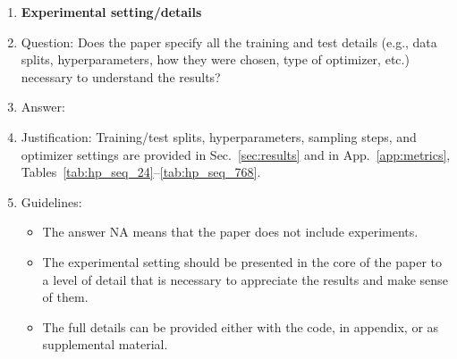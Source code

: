 \documentclass{article}
\theoremstyle{plain}
\theoremstyle{definition}
\theoremstyle{remark}
\begin{document}
{\begin{enumerate}
\item {\bf Experimental setting/details}
    \item[] Question: Does the paper specify all the training and test details (e.g., data splits, hyperparameters, how they were chosen, type of optimizer, etc.) necessary to understand the results?
    \item[] Answer: \answerYes{}
    \item[] Justification: Training/test splits, hyperparameters, sampling steps, and optimizer settings are provided in Sec.~\ref{sec:results} and in App.~\ref{app:metrics}, Tables~\ref{tab:hp_seq_24}–\ref{tab:hp_seq_768}.
    \item[] Guidelines:
    \begin{itemize}
        \item The answer NA means that the paper does not include experiments.
        \item The experimental setting should be presented in the core of the paper to a level of detail that is necessary to appreciate the results and make sense of them.
        \item The full details can be provided either with the code, in appendix, or as supplemental material.
    \end{itemize}


\end{enumerate}}
\end{document}
